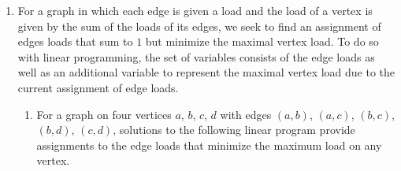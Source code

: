 \documentclass[letterpaper,11pt]{article}
\begin{document}
\begin{enumerate}
\begin{proof}
            Finally, we consider the following equality, which is a
            reformulation of what it means to lie on the line between $x$ and
            $x^\prime$.
            \begin{align}
                (\alpha x \cdot a + (1 - \alpha) x^\prime) \cdot a
                &= \alpha x \cdot a + (1 - \alpha) \cdot a \notag \\
                &= \alpha x \cdot a + x^\prime \cdot a - \alpha x^\prime \cdot a \label{eq:qed}
            \end{align}

            Adding up inequalities \eqref{ineq:oneminusalphax} and
            \eqref{ineq:alphax}, we arrive at the statement we wish to prove,
            which completes the proof.

            Alternatively, suppose that a point on the line between $x$ and
            $x^\prime$ were not a feasible solution. Geometrically, that would
            be a contradiction of the convexity of the feasible region. Hence,
            all points on a line between any two feasible solutions must be
            feasible solutions.
        \end{proof}

    \item For a graph in which each edge is given a load and the load of a
        vertex is given by the sum of the loads of its edges, we seek to find
        an assignment of edges loads that sum to $1$ but minimize the maximal
        vertex load. To do so with linear programming, the set of variables
        consists of the edge loads as well as an additional variable to
        represent the maximal vertex load due to the current assignment of edge
        loads.

        \begin{enumerate}
            \item For a graph on four vertices $a$, $b$, $c$, $d$ with edges
                $(a, b)$, $(a, c)$, $(b, c)$, $(b, d)$, $(c, d)$, solutions
                to the following linear program provide assignments to the
                edge loads that minimize the maximum load on any vertex.


\end{enumerate}
\end{enumerate}
\end{document}
